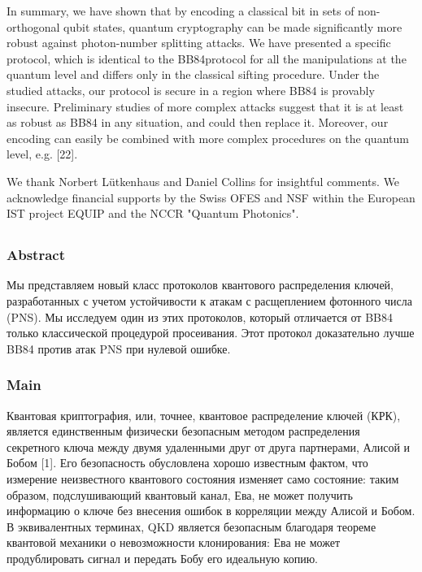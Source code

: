 In summary, we have shown that by encoding a classical bit in sets of non-orthogonal qubit states, quantum cryptography can be made significantly more robust against photon-number splitting attacks. We have presented a specific protocol, which is identical to the BB84protocol for all the manipulations at the quantum level and differs only in the classical sifting procedure. Under the studied attacks, our protocol is secure in a region where BB84 is provably insecure. Preliminary studies of more complex attacks suggest that it is at least as robust as BB84 in any situation, and could then replace it. Moreover, our encoding can easily be combined with more complex procedures on the quantum level, e.g. [22].

We thank Norbert Lütkenhaus and Daniel Collins for insightful comments. We acknowledge financial supports by the Swiss OFES and NSF within the European IST project EQUIP and the NCCR "Quantum Photonics".


\subsection{\trnas}
\subsubsection*{Abstract}

Мы представляем новый класс протоколов квантового распределения ключей, разработанных с учетом устойчивости к атакам с расщеплением фотонного числа (PNS). Мы исследуем один из этих протоколов, который отличается от BB84 только классической процедурой просеивания. Этот протокол доказательно лучше BB84 против атак PNS при нулевой ошибке.


\subsubsection*{Main}
Квантовая криптография, или, точнее, квантовое распределение ключей (КРК), является единственным физически безопасным методом распределения секретного ключа между двумя удаленными друг от друга партнерами, Алисой и Бобом [1]. Его безопасность обусловлена хорошо известным фактом, что измерение неизвестного квантового состояния изменяет само состояние: таким образом, подслушивающий квантовый канал, Ева, не может получить информацию о ключе без внесения ошибок в корреляции между Алисой и Бобом. В эквивалентных терминах, QKD является безопасным благодаря теореме квантовой механики о невозможности клонирования: Ева не может продублировать сигнал и передать Бобу его идеальную копию.

